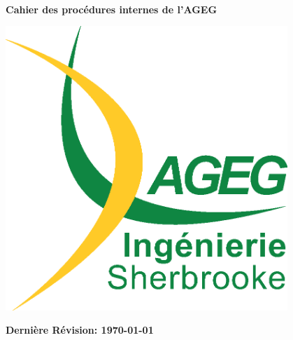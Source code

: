 \setcounter{reglement}{0}
\renewcommand{\thepage}{PR \arabic{page}}
\begin{titlepage}
\begin{center}

\vfill~\\[1cm]
{\Huge \bfseries Cahier des procédures internes de l'AGEG}

\vfill

\includegraphics[width=0.8\textwidth]{./Images/A11-LogoAGEG-002-AJC.eps}~\\[1cm]

\vfill

{\bfseries \LARGE Dernière Révision: \today}

\end{center}
\end{titlepage}
